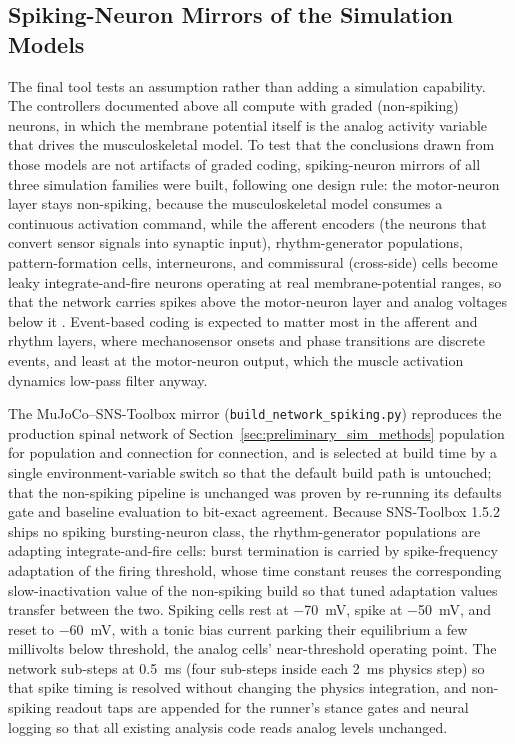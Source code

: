 \subsection{Spiking-Neuron Mirrors of the Simulation Models}\label{sec:spiking_methods}

The final tool tests an assumption rather than adding a simulation capability. The controllers documented above all compute with graded (non-spiking) neurons, in which the membrane potential itself is the analog activity variable that drives the musculoskeletal model. To test that the conclusions drawn from those models are not artifacts of graded coding, spiking-neuron mirrors of all three simulation families were built, following one design rule: the motor-neuron layer stays non-spiking, because the musculoskeletal model consumes a continuous activation command, while the afferent encoders (the neurons that convert sensor signals into synaptic input), rhythm-generator populations, pattern-formation cells, interneurons, and commissural (cross-side) cells become leaky integrate-and-fire neurons operating at real membrane-potential ranges, so that the network carries spikes above the motor-neuron layer and analog voltages below it \citep{szczecinski_perspective_2023, nourse_sns_2023}. Event-based coding is expected to matter most in the afferent and rhythm layers, where mechanosensor onsets and phase transitions are discrete events, and least at the motor-neuron output, which the muscle activation dynamics low-pass filter anyway.

The MuJoCo--SNS-Toolbox mirror (\texttt{build\_network\_spiking.py}) reproduces the production spinal network of Section~\ref{sec:preliminary_sim_methods} population for population and connection for connection, and is selected at build time by a single environment-variable switch so that the default build path is untouched; that the non-spiking pipeline is unchanged was proven by re-running its defaults gate and baseline evaluation to bit-exact agreement. Because SNS-Toolbox 1.5.2 ships no spiking bursting-neuron class, the rhythm-generator populations are adapting integrate-and-fire cells: burst termination is carried by spike-frequency adaptation of the firing threshold, whose time constant reuses the corresponding slow-inactivation value of the non-spiking build so that tuned adaptation values transfer between the two. Spiking cells rest at \qty{-70}{\mV}, spike at \qty{-50}{\mV}, and reset to \qty{-60}{\mV}, with a tonic bias current parking their equilibrium a few millivolts below threshold, the analog cells' near-threshold operating point. The network sub-steps at \qty{0.5}{\ms} (four sub-steps inside each \qty{2}{\ms} physics step) so that spike timing is resolved without changing the physics integration, and non-spiking readout taps are appended for the runner's stance gates and neural logging so that all existing analysis code reads analog levels unchanged.

